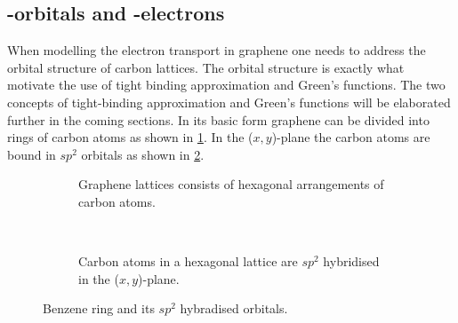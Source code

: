 \subsection{\mathinhead{\pi}{\pi}-orbitals and \mathinhead{\pi}{\pi}-electrons}
When modelling the electron transport in graphene one needs to address the orbital structure of carbon lattices. The orbital structure is exactly what motivate the use of tight binding approximation and Green's functions. The two concepts of tight-binding approximation and Green's functions will be elaborated further in the coming sections.
In its basic form graphene can be divided into rings of carbon atoms as shown in \cref{ring}. In the (\(x,y\))-plane the carbon atoms are bound in \(sp^2\) orbitals as shown in \cref{sp2}.
\begin{figure}[ht]
	\centering
	\begin{subfigure}[b]{0.3\textwidth}
		\caption{Graphene lattices consists of hexagonal arrangements of carbon atoms.}\label{ring}
	\end{subfigure}
	~
	\begin{subfigure}[b]{0.3\textwidth}
		\centering
		\caption{Carbon atoms in a hexagonal lattice are \(sp^2\) hybridised in the (\(x,y\))-plane.}\label{sp2}
	\end{subfigure}
	\caption{Benzene ring and its \(sp^2\) hybradised orbitals.}\label{Benz}
\end{figure}
